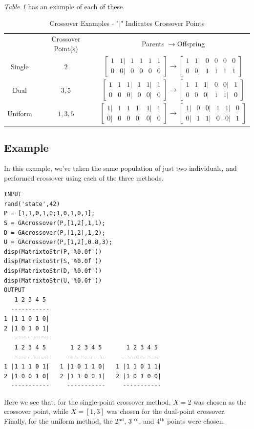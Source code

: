 \documentclass{book}
\begin{document}
\emph{Table \ref{tab_xoverex}} has an example of each of these.
\begin{table}[htbp]
\begin{center}
\begin{tabular}{ccc}
& Crossover Point(s) & Parents $\longrightarrow $Offspring \\
Single & $2$ & $%
\begin{bmatrix}
1 & 1| & 1 & 1 & 1 & 1 \\
0 & 0| & 0 & 0 & 0 & 0%
\end{bmatrix}%
\longrightarrow
\begin{bmatrix}
1 & 1| & 0 & 0 & 0 & 0 \\
0 & 0| & 1 & 1 & 1 & 1%
\end{bmatrix}%
$ \\
Dual & $3,5$ & $%
\begin{bmatrix}
1 & 1 & 1| & 1 & 1| & 1 \\
0 & 0 & 0| & 0 & 0| & 0%
\end{bmatrix}%
\longrightarrow
\begin{bmatrix}
1 & 1 & 1| & 0 & 0| & 1 \\
0 & 0 & 0| & 1 & 1| & 0%
\end{bmatrix}%
$ \\
Uniform & $1,3,5$ & $%
\begin{bmatrix}
1| & 1 & 1 & 1| & 1| & 1 \\
0| & 0 & 0 & 0| & 0| & 0%
\end{bmatrix}%
\longrightarrow
\begin{bmatrix}
1| & 0 & 0| & 1 & 1| & 0 \\
0| & 1 & 1| & 0 & 0| & 1%
\end{bmatrix}%
$%
\end{tabular}%
\end{center}
\caption{Crossover Examples - "$|$" Indicates Crossover Points}
\label{tab_xoverex}
\end{table}

\subsection*{Example}

In this example, we've taken the same population of just two individuals,
and performed crossover using each of the three methods.
\begin{verbatim}
INPUT
rand('state',42)
P = [1,1,0,1,0;1,0,1,0,1];
S = GAcrossover(P,[1,2],1,1);
D = GAcrossover(P,[1,2],1,2);
U = GAcrossover(P,[1,2],0.8,3);
disp(MatrixtoStr(P,'%0.0f'))
disp(MatrixtoStr(S,'%0.0f'))
disp(MatrixtoStr(D,'%0.0f'))
disp(MatrixtoStr(U,'%0.0f'))
OUTPUT
   1 2 3 4 5
  -----------
1 |1 1 0 1 0|
2 |1 0 1 0 1|
  -----------
   1 2 3 4 5       1 2 3 4 5       1 2 3 4 5
  -----------     -----------     -----------
1 |1 1 1 0 1|   1 |1 0 1 1 0|   1 |1 1 0 1 1|
2 |1 0 0 1 0|   2 |1 1 0 0 1|   2 |1 0 1 0 0|
  -----------     -----------     -----------
\end{verbatim}
Here we see that, for the single-point crossover method, $X=2$
was chosen as the crossover point, while $X=\left[ 1,3\right] $
was chosen for the
dual-point crossover. Finally, for the uniform method, the 2$^{\text{nd}}$, 3%
$^{\text{rd}}$, and 4$^{\text{th}}$ points were chosen.
\end{document}
